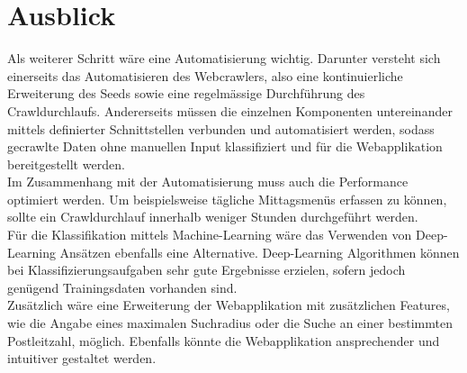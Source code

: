 \section{Ausblick}
Als weiterer Schritt wäre eine Automatisierung wichtig.
Darunter versteht sich einerseits das Automatisieren des Webcrawlers, also eine kontinuierliche Erweiterung des Seeds sowie eine regelmässige Durchführung des Crawldurchlaufs.
Andererseits müssen die einzelnen Komponenten untereinander mittels definierter Schnittstellen verbunden und automatisiert werden, sodass gecrawlte Daten ohne manuellen Input klassifiziert und für die Webapplikation bereitgestellt werden.\\
Im Zusammenhang mit der Automatisierung muss auch die Performance optimiert werden.
Um beispielsweise tägliche Mittagsmenüs erfassen zu können, sollte ein Crawldurchlauf innerhalb weniger Stunden durchgeführt werden.\\
Für die Klassifikation mittels Machine-Learning wäre das Verwenden von Deep-Learning Ansätzen ebenfalls eine Alternative.
Deep-Learning Algorithmen können bei Klassifizierungsaufgaben sehr gute Ergebnisse erzielen, sofern jedoch genügend Trainingsdaten vorhanden sind.\\
Zusätzlich wäre eine Erweiterung der Webapplikation mit zusätzlichen Features, wie die Angabe eines maximalen Suchradius oder die Suche an einer bestimmten Postleitzahl, möglich.
Ebenfalls könnte die Webapplikation ansprechender und intuitiver gestaltet werden.
 

